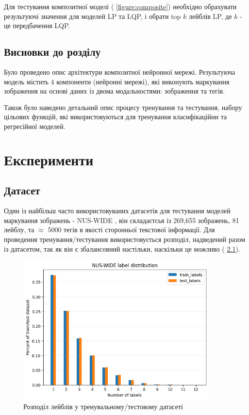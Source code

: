 \documentclass{udstu}
\begin{document}
Для тестування композитної моделі (\figurename{ \ref{figure:composite}})
необхідно обрахувати результуючі значення для моделей LP та LQP, і обрати
top $k$ лейблів LP, де $k$ - це передбачення LQP.


\section{Висновки до розділу}

Було проведено опис архітектури композитної нейронної мережі. Результуюча модель
містить 4 компоненти (нейронні мережі), які виконують маркування зображення
на основі даних із двома модальностями: зображення та тегів.

Також було наведено детальний опис процесу тренування та тестування, набору цільових функцій, які використовуються
для тренування класифікаційни та регресійної моделей.


\chapter{Експерименти}

\section{Датасет}

Один із найбільш часто використовуваних датасетів для тестування моделей маркування зображень - NUS-WIDE \cite{nus-wide-civr09},
він складаєтсья із 269,655 зображень, 81 лейблу, та $\approx$ 5000 тегів в якості сторонньої текстової інформації.
Для проведення тренування/тестування використовується розподіл, надведений разом із
датасетом, так як він є збалансовний настільки, наскільки це можливо (\figurename{ \ref{figure:nus-wide-dist}}).

\begin{figure}[!ht]
	\centering
	\includegraphics[width=0.9\textwidth]{PNG/nus-wide-label-dist}
	\caption{Розподіл лейблів у тренувальному/тестовому датасеті}
	\label{figure:nus-wide-dist}
\end{figure}
\end{document}
